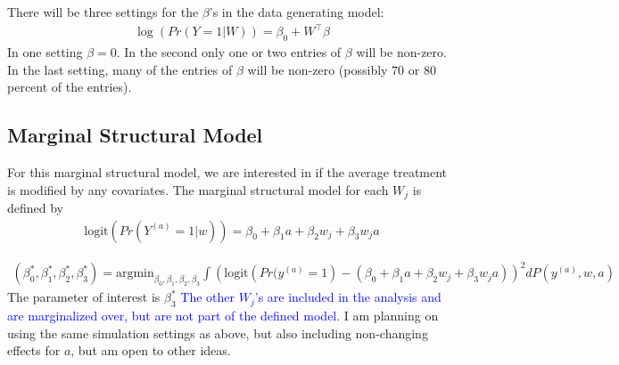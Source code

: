 \documentclass{article}
\newcommand{\sh}{\textcolor{red}}
\begin{document}
There will be three settings for the $\beta$'s in the data generating model:
\begin{align*}
    \log(Pr(Y = 1 | W)) = \beta_0 + W^\top \beta
\end{align*}
In one setting $\beta = 0$.  In the second only one or two entries of $\beta$ will be non-zero.  In the last setting, many of the entries of $\beta$ will be non-zero (possibly $70$ or $80$ percent of the entries). 

\subsection{Marginal Structural Model}
For this marginal structural model, we are interested in if the average treatment is modified by any covariates.  The marginal structural model for each $W_j$ is defined by
\begin{align*}
\text{logit}\left(Pr(Y^{(a)} = 1 | w)\right) = \beta_0 + \beta_1 a + \beta_2 w_j + \beta_3 w_j a
\end{align*}

\begin{align*}
(\beta_0^*, \beta_1^*, \beta_2^*, \beta_3^*) = \text{argmin}_{\beta_0, \beta_1, \beta_2, \beta_3}\int\left(\text{logit}\left(Pr(y^{(a)} = 1\right) - (\beta_0 + \beta_1 a + \beta_2w_j + \beta_3 w_j a) \right)^2 dP(y^{(a)}, w, a)
\end{align*}
The parameter of interest is $\beta_3^*$
\textcolor{blue}{The other $W_j$'s are included in the analysis and are marginalized over, but are not part of the defined model.} I am planning on using the same simulation settings as above, but also including non-changing effects for $a$, but am open to other ideas.
\end{document}
